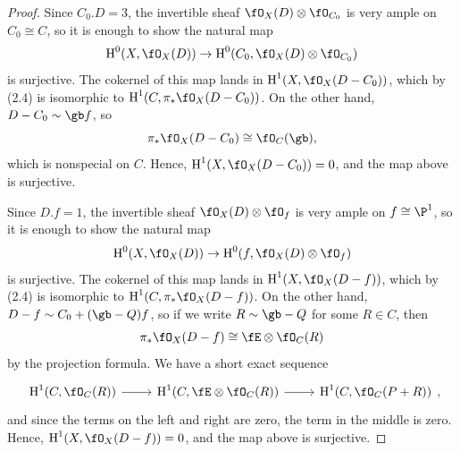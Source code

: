 \documentclass[a4paper]{article}
\begin{document}
\begin{enumerate} [label=\textbf{\arabic*.}, leftmargin=0em]
\begin{proof}
              Since $C_0.D = 3$, the invertible sheaf $\fO_X(D) \otimes \fO_{C_0}$ is very ample on $C_0 \cong C$, so it is enough to show the natural map
              \begin{equation*}
                  \cH^0(X, \fO_X(D)) \to \cH^0(C_0, \fO_X(D) \otimes \fO_{C_0})
              \end{equation*}
              is surjective.
              The cokernel of this map lands in $\cH^1(X, \fO_X(D - C_0))$, which by (2.4) is isomorphic to $\cH^1(C, \pi_*\fO_X(D - C_0))$.
              On the other hand, $D - C_0 \sim \gb f$, so
              \begin{equation*}
                  \pi_*\fO_X(D - C_0) \cong \fO_C(\gb),
              \end{equation*}
              which is nonspecial on $C$.
              Hence, $\cH^1(X, \fO_X(D - C_0)) = 0$, and the map above is surjective.

              Since $D.f = 1$, the invertible sheaf $\fO_X(D) \otimes \fO_{f}$ is very ample on $f \cong \P^1$, so it is enough to show the natural map
              \begin{equation*}
                  \cH^0(X, \fO_X(D)) \to \cH^0(f, \fO_X(D) \otimes \fO_{f})
              \end{equation*}
              is surjective.
              The cokernel of this map lands in $\cH^1(X, \fO_X(D - f))$, which by (2.4) is isomorphic to $\cH^1(C, \pi_*\fO_X(D - f))$.
              On the other hand, $D - f \sim C_0 + (\gb - Q)f$, so if we write $R \sim \gb - Q$ for some $R \in C$, then
              \begin{equation*}
                  \pi_*\fO_X(D - f) \cong \fE \otimes \fO_{C}(R)
              \end{equation*}
              by the projection formula.
              We have a short exact sequence
              \[ \begin{tikzcd}
                      {\cH^1(C, \fO_C(R))} \arrow[r] & {\cH^1(C, \fE \otimes \fO_C(R))} \arrow[r] & {\cH^1(C, \fO_C(P + R))}
                  \end{tikzcd}, \]
              and since the terms on the left and right are zero, the term in the middle is zero.
              Hence, $\cH^1(X, \fO_X(D - f)) = 0$, and the map above is surjective.
          \end{proof}


\end{enumerate}
\end{document}
